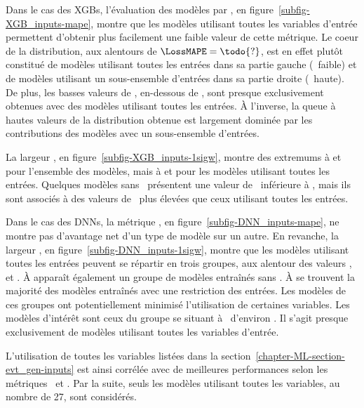 \par
Dans le cas des XGBs,
l'évaluation des modèles par \LossMAPE, en figure~\ref{subfig-XGB_inputs-mape},
montre que les modèles utilisant toutes les variables d'entrée permettent d'obtenir plus facilement
une faible valeur de cette métrique.
Le coeur de la distribution,
aux alentours de $\LossMAPE=\todo{?}$,
est en effet plutôt constitué
de modèles utilisant
toutes les entrées
dans sa partie gauche (\LossMAPE\ faible)
et
de modèles utilisant
un sous-ensemble d'entrées
dans sa partie droite (\LossMAPE\ haute).
De plus, les basses valeurs de \LossMAPE, en-dessous de ,
sont presque exclusivement obtenues avec des modèles utilisant toutes les entrées.
À l'inverse, la queue à hautes valeurs de la distribution obtenue est largement dominée par les contributions des modèles avec un sous-ensemble d'entrées.
\par
La largeur \OneSigmaWidth, en figure~\ref{subfig-XGB_inputs-1sigw},
montre des extremums
à  et 
pour l'ensemble des modèles,
mais
à  et 
pour les modèles utilisant toutes les entrées.
Quelques modèles sans \mT\ présentent
une valeur de \OneSigmaWidth\
inférieure à ,
mais ils sont associés à des valeurs de \LossMAPE\
plus élevées que ceux utilisant toutes les entrées.
\par
Dans le cas des DNNs,
la métrique \LossMAPE, en figure~\ref{subfig-DNN_inputs-mape},
ne montre pas d'avantage net d'un type de modèle sur un autre.
En revanche,
la largeur \OneSigmaWidth, en figure~\ref{subfig-DNN_inputs-1sigw},
montre que les modèles utilisant toutes les entrées peuvent se répartir en trois groupes,
aux alentour des valeurs
\todo{?}, \todo{?} et \todo{?}.
À  apparaît également un groupe de modèles entraînés sans \mT.
À \todo{?2e} se trouvent la majorité des modèles entraînés avec une restriction des entrées.
Les modèles de ces groupes ont potentiellement minimisé l'utilisation de certaines variables.
Les modèles d'intérêt sont ceux du groupe se situant à \OneSigmaWidth\ d'environ \todo{?1er}.
Il s'agit presque exclusivement de modèles utilisant toutes les variables d'entrée.
\par
L'utilisation de toutes les variables listées dans la section~\ref{chapter-ML-section-evt_gen-inputs}
est ainsi corrélée avec de meilleures performances
selon les métriques
\LossMAPE\
et \OneSigmaWidth.
Par la suite, seuls les modèles utilisant toutes les variables, au nombre de 27, sont considérés.

